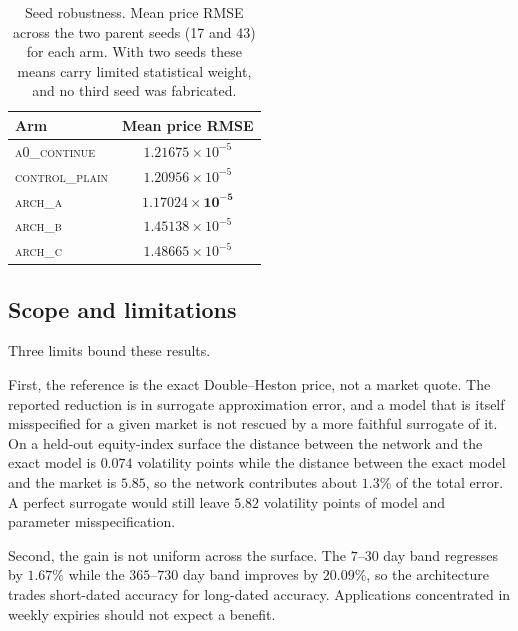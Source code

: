 \begin{table}[t]
\centering
\caption{Seed robustness. Mean price RMSE across the two parent seeds (17 and
43) for each arm. With two seeds these means carry limited statistical weight,
and no third seed was fabricated.}
\label{tab:seeds}
\begin{tabular}{lc}
\toprule
Arm & Mean price RMSE \\
\midrule
\textsc{a0\_continue}   & $1.21675\times10^{-5}$ \\
\textsc{control\_plain} & $1.20956\times10^{-5}$ \\
\textsc{arch\_a}        & $\mathbf{1.17024\times10^{-5}}$ \\
\textsc{arch\_b}        & $1.45138\times10^{-5}$ \\
\textsc{arch\_c}        & $1.48665\times10^{-5}$ \\
\bottomrule
\end{tabular}
\end{table}


\subsection{Scope and limitations}

Three limits bound these results.

First, the reference is the exact Double--Heston price, not a market quote. The
reported reduction is in surrogate approximation error, and a model that is
itself misspecified for a given market is not rescued by a more faithful
surrogate of it. On a held-out equity-index surface the distance between the
network and the exact model is $0.074$ volatility points while the distance
between the exact model and the market is $5.85$, so the network contributes
about $1.3\%$ of the total error. A perfect surrogate would still leave
$5.82$ volatility points of model and parameter misspecification.

Second, the gain is not uniform across the surface. The $7$--$30$ day band
regresses by $1.67\%$ while the $365$--$730$ day band improves by $20.09\%$, so
the architecture trades short-dated accuracy for long-dated accuracy.
Applications concentrated in weekly expiries should not expect a benefit.

